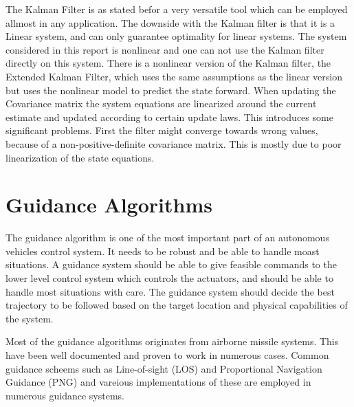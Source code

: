 	The Kalman Filter is as stated befor a very versatile tool which can be employed allmost in
	any application. The downside with the Kalman filter is that it is a Linear system, and can only
	guarantee optimality for linear systems. The system considered in this report is nonlinear and one can not
	use the Kalman filter directly on this system. There is a nonlinear version of the Kalman filter, the
	Extended Kalman Filter, which uses the same assumptions as the linear version but uses the nonlinear
	model to predict the state forward. When updating the Covariance matrix the system equations are
	linearized around the current estimate and updated according to certain update laws. This introduces some
	significant problems. First the filter might converge towards wrong values, because of a non-positive-definite
	covariance matrix. This is mostly due to poor linearization of the state equations. \cite{kalman}
	
\section{Guidance Algorithms}
        \label{chap1-guidance-alg}
        The guidance algorithm is one of the most important part of an autonomous vehicles control system. It
	needs to be robust and be able to handle moast situations. A guidance system should be able to give
	feasible commands to the lower level control system which controls the actuators, and should be able
	to handle most situations with care. The guidance system should decide the best trajectory to be
	followed based on the target location and physical capabilities of the system.\cite{GuidanceReview}

	Most of the guidance algorithms originates from airborne missile systems. This have been well
	documented and proven to work in numerous cases. Common guidance scheems such as Line-of-sight (LOS)
	and Proportional Navigation Guidance (PNG) and vareious implementations of these are employed in
	numerous guidance systems.
	
